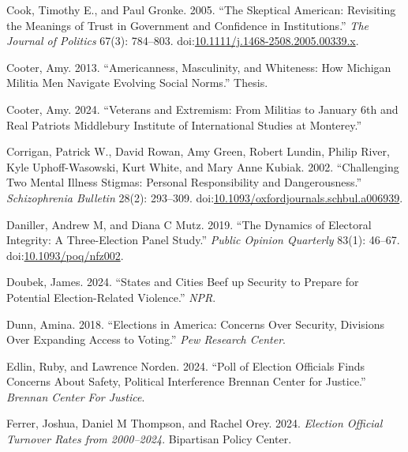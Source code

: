 \documentclass[
  12pt,
  letterpaper,
]{article}
\newlength{\cslhangindent}
\newenvironment{CSLReferences}[2] %
 {\begin{list}{}{%
  \setlength{\itemindent}{0pt}
  \setlength{\leftmargin}{0pt}
  \setlength{\parsep}{0pt}
  \ifodd #1
   \setlength{\leftmargin}{\cslhangindent}
   \setlength{\itemindent}{-1\cslhangindent}
  \fi
  \setlength{\itemsep}{#2\baselineskip}}}
 {\end{list}}
\begin{document}
\begin{CSLReferences}{1}{1}
Cook, Timothy E., and Paul Gronke. 2005. {``The {Skeptical American}:
{Revisiting} the {Meanings} of {Trust} in {Government} and {Confidence}
in {Institutions}.''} \emph{The Journal of Politics} 67(3): 784--803.
doi:\href{https://doi.org/10.1111/j.1468-2508.2005.00339.x}{10.1111/j.1468-2508.2005.00339.x}.

Cooter, Amy. 2013. {``Americanness, {Masculinity}, and {Whiteness}: {How
Michigan Militia Men Navigate Evolving Social Norms}.''} Thesis.

Cooter, Amy. 2024. {``Veterans and {Extremism}: {From Militias} to
{January} 6th and {Real Patriots} {\textbar} {Middlebury Institute} of
{International Studies} at {Monterey}.''}

Corrigan, Patrick W., David Rowan, Amy Green, Robert Lundin, Philip
River, Kyle Uphoff-Wasowski, Kurt White, and Mary Anne Kubiak. 2002.
{``Challenging {Two Mental Illness Stigmas}: {Personal Responsibility}
and {Dangerousness}.''} \emph{Schizophrenia Bulletin} 28(2): 293--309.
doi:\href{https://doi.org/10.1093/oxfordjournals.schbul.a006939}{10.1093/oxfordjournals.schbul.a006939}.

Daniller, Andrew M, and Diana C Mutz. 2019. {``The {Dynamics} of
{Electoral Integrity}: {A Three-Election Panel Study}.''} \emph{Public
Opinion Quarterly} 83(1): 46--67.
doi:\href{https://doi.org/10.1093/poq/nfz002}{10.1093/poq/nfz002}.

Doubek, James. 2024. {``States and Cities Beef up Security to Prepare
for Potential Election-Related Violence.''} \emph{NPR}.

Dunn, Amina. 2018. {``Elections in {America}: {Concerns Over Security},
{Divisions Over Expanding Access} to {Voting}.''} \emph{Pew Research
Center}.

Edlin, Ruby, and Lawrence Norden. 2024. {``Poll of {Election Officials
Finds Concerns About Safety}, {Political Interference} {\textbar}
{Brennan Center} for {Justice}.''} \emph{Brennan Center For Justice}.

Ferrer, Joshua, Daniel M Thompson, and Rachel Orey. 2024. \emph{Election
{Official Turnover Rates} from 2000--2024}. Bipartisan Policy Center.


\end{CSLReferences}
\end{document}
